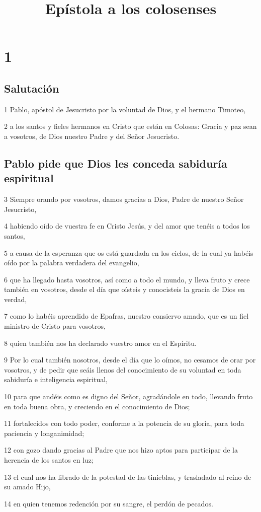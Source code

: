 
\title{Epístola a los colosenses}

\chapter{1}

\section*{Salutación}

\par 1 Pablo, apóstol de Jesucristo por la voluntad de Dios, y el hermano Timoteo,
\par 2 a los santos y fieles hermanos en Cristo que están en Colosas: Gracia y paz sean a vosotros, de Dios nuestro Padre y del Señor Jesucristo.

\section*{Pablo pide que Dios les conceda sabiduría espiritual}

\par 3 Siempre orando por vosotros, damos gracias a Dios, Padre de nuestro Señor Jesucristo,
\par 4 habiendo oído de vuestra fe en Cristo Jesús, y del amor que tenéis a todos los santos,
\par 5 a causa de la esperanza que os está guardada en los cielos, de la cual ya habéis oído por la palabra verdadera del evangelio,
\par 6 que ha llegado hasta vosotros, así como a todo el mundo, y lleva fruto y crece también en vosotros, desde el día que oísteis y conocisteis la gracia de Dios en verdad,
\par 7 como lo habéis aprendido de Epafras, nuestro consiervo amado, que es un fiel ministro de Cristo para vosotros,
\par 8 quien también nos ha declarado vuestro amor en el Espíritu.
\par 9 Por lo cual también nosotros, desde el día que lo oímos, no cesamos de orar por vosotros, y de pedir que seáis llenos del conocimiento de su voluntad en toda sabiduría e inteligencia espiritual,
\par 10 para que andéis como es digno del Señor, agradándole en todo, llevando fruto en toda buena obra, y creciendo en el conocimiento de Dios;
\par 11 fortalecidos con todo poder, conforme a la potencia de su gloria, para toda paciencia y longanimidad;
\par 12 con gozo dando gracias al Padre que nos hizo aptos para participar de la herencia de los santos en luz;
\par 13 el cual nos ha librado de la potestad de las tinieblas, y trasladado al reino de su amado Hijo,
\par 14 en quien tenemos redención por su sangre, el perdón de pecados.

